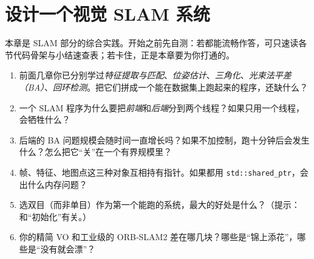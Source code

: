 \chapter{设计一个视觉 SLAM 系统}
\label{ch:slam_system}


\begin{practice}[前置自测]
本章是 SLAM 部分的综合实践。开始之前先自测：若都能流畅作答，可只速读各节代码骨架与小结速查表；若卡住，正是本章要为你打通的。
\begin{enumerate}
  \item 前面几章你已分别学过\emph{特征提取与匹配}、\emph{位姿估计}、\emph{三角化}、\emph{光束法平差（BA）}、\emph{回环检测}。把它们拼成一个能在数据集上跑起来的程序，还缺什么？
  \item 一个 SLAM 程序为什么要把\emph{前端}和\emph{后端}分到两个线程？如果只用一个线程，会牺牲什么？
  \item 后端的 BA 问题规模会随时间一直增长吗？如果不加控制，跑十分钟后会发生什么？怎么把它“关”在一个有界规模里？
  \item 帧、特征、地图点这三种对象互相持有指针。如果都用 \texttt{std::shared\_ptr}，会出什么内存问题？
  \item 选双目（而非单目）作为第一个能跑的系统，最大的好处是什么？（提示：和“初始化”有关。）
  \item 你的精简 VO 和工业级的 ORB-SLAM2 差在哪几块？哪些是“锦上添花”，哪些是“没有就会漂”？
\end{enumerate}
\end{practice}

